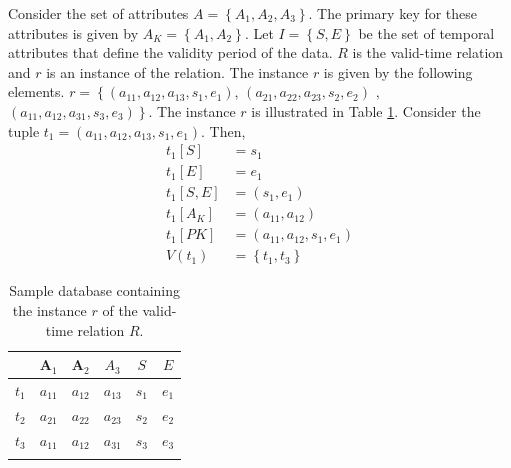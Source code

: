 \documentclass{llncs}
\begin{document}
\begin{example}
Consider the set of attributes $A = \left \lbrace A_1, A_2, A_3 \right \rbrace$. The primary key for these attributes is given by $A_K = \left \lbrace A_1, A_2 \right \rbrace$. Let $I = \left \lbrace S, E \right \rbrace$ be the set of temporal attributes that define the validity period of the data. $R$ is the valid-time relation and $r$ is an instance of the relation. The instance $r$ is given by the following elements. $r = \left \lbrace \left(a_{11}, a_{12}, a_{13}, s_1 ,e_1 \right) \right.$,  $\left(a_{21}, a_{22}, a_{23}, s_2, e_2 \right)$ , $\left. \left(a_{11}, a_{12}, a_{31}, s_3, e_3 \right) \right \rbrace$. The instance $r$ is illustrated in Table \ref{tbl:sample-definitions}. 
Consider the tuple $t_1 = \left(a_{11}, a_{12}, a_{13}, s_1 ,e_1 \right)$. Then,
\begin{align}
 \nonumber
 t_1\left[S \right]&=s_1\\
 \nonumber
t_1[E]&=e_1\\
 \nonumber
t_1[S,E]&= \left(s_1, e_1\right)\\
 \nonumber
t_1\left[A_K\right] &= \left(a_{11}, a_{12} \right) \\
 \nonumber
t_1\left[PK\right] &=\left(a_{11}, a_{12}, s_1, e_1\right)\\
 \nonumber
V(t_1) &= \left \lbrace t_1, t_3 \right \rbrace
\end{align}

\begin{table}
\centering
\label{tbl:sample-definitions}
\caption{Sample database containing the instance $r$ of the valid-time relation $R$.}
\begin{tabular}{c c c c c c}\\
\hline
& \textbf{A$_1$}  & \textbf{A$_2$}  & $A_3$ & $S$ & $E$ \\
\hline
$t_1$&$a_{11}$ & $a_{12}$ & $a_{13}$ & $s_1$ & $e_1$ \\
$t_2$ & $a_{21}$ & $a_{22}$ & $a_{23}$ &  $s_2$ & $e_2$ \\
$t_3$ & $a_{11}$ & $a_{12}$ & $a_{31}$ & $s_3$ & $e_3$\\
\hline\\
\end{tabular}
\end{table}


\end{example}

% 
\end{document}
